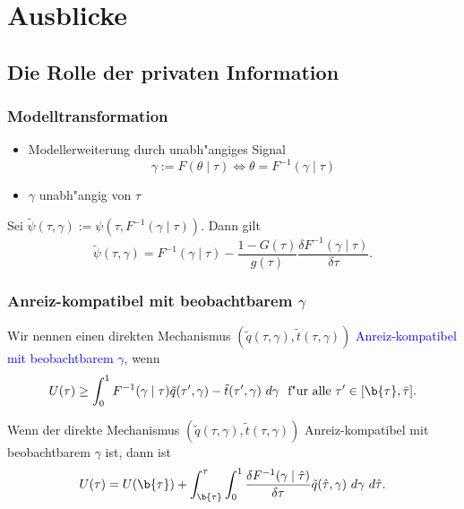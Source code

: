 \section{Ausblicke}

\subsection{Die Rolle der privaten Information}
\begin{frame}
\frametitle{Modelltransformation}
\justifying
\begin{itemize}
  \item Modellerweiterung durch unabh"angiges Signal
  \begin{equation*}
    \gamma := F(\theta \mid \tau) \Leftrightarrow \theta = F^{-1}(\gamma \mid \tau)
  \end{equation*}
  \item $\gamma$ unabh"angig von $\tau$
\end{itemize}
\begin{thmL}
  Sei $\tilde{\psi}(\tau, \gamma) := \psi(\tau, F^{-1}(\gamma \mid \tau))$. Dann gilt
  \begin{equation*}
    \tilde{\psi}(\tau, \gamma) = F^{-1}(\gamma \mid \tau) - \dfrac{1-G(\tau)}{g(\tau)} \dfrac{\delta F^{-1}(\gamma \mid \tau)}{\delta \tau}.
  \end{equation*}
\end{thmL}
\end{frame}

\begin{frame}
\frametitle{Anreiz-kompatibel mit beobachtbarem $\gamma$}
\justifying
\begin{thmD}
  Wir nennen einen direkten Mechanismus $(\tilde{q}(\tau, \gamma), \tilde{t}(\tau, \gamma))$ \textcolor{blue}{Anreiz-kompatibel mit beobachtbarem $\gamma$}, wenn
  \begin{equation*}
    U(\tau) \geq \int_{0}^{1} F^{-1}(\gamma \mid \tau) \tilde{q}(\tau', \gamma) - \tilde{t}(\tau', \gamma) \ d \gamma \text{~ f"ur alle } \tau' \in [\b{\tau}, \bar{\tau}].
  \end{equation*}
\end{thmD}
\begin{thmP}
  Wenn der direkte Mechanismus $(\tilde{q}(\tau, \gamma), \tilde{t}(\tau, \gamma))$ Anreiz-kompatibel mit beobachtbarem $\gamma$ ist, dann ist
  \begin{equation*}
    U(\tau) = U(\b{\tau}) + \int_{\b{\tau}}^{\tau} \int_{0}^{1} \dfrac{\delta F^{-1}(\gamma \mid \hat{\tau})}{\delta \tau} \tilde{q}(\hat{\tau}, \gamma) \ d \gamma \ d \hat{\tau}.
  \end{equation*}
\end{thmP}
\end{frame}

